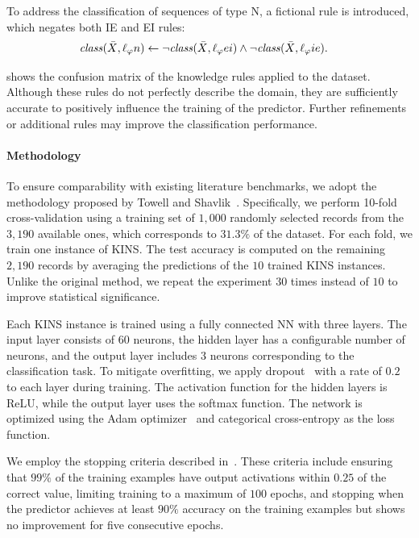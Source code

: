 To address the classification of sequences of type N, a fictional rule is introduced, which negates both \gls{IE} and \gls{EI} rules:
%
\begin{align}
    \mathit{class}(\bar{X}, \ell_{\varphi}{n}) &\leftarrow \neg \mathit{class}(\bar{X}, \ell_{\varphi}{ei}) \land \neg \mathit{class}(\bar{X}, \ell_{\varphi}{ie}).
\end{align}

 shows the confusion matrix of the knowledge rules applied to the dataset.
%
Although these rules do not perfectly describe the domain, they are sufficiently accurate to positively influence the training of the predictor.
%
Further refinements or additional rules may improve the classification performance.


\paragraph{Methodology}\label{par:kins-psjgs-methodology}
%
To ensure comparability with existing literature benchmarks, we adopt the methodology proposed by Towell and Shavlik~\cite{DBLP:journals/ai/TowellS94}.
%
Specifically, we perform 10-fold cross-validation using a training set of $1,000$ randomly selected records from the $3,190$ available ones, which corresponds to $31.3\%$ of the dataset.
%
For each fold, we train one instance of \gls{KINS}.
%
The test accuracy is computed on the remaining $2,190$ records by averaging the predictions of the $10$ trained \gls{KINS} instances.
%
Unlike the original method, we repeat the experiment $30$ times instead of $10$ to improve statistical significance.

Each \gls{KINS} instance is trained using a fully connected \gls{NN} with three layers.
%
The input layer consists of $60$ neurons, the hidden layer has a configurable number of neurons, and the output layer includes $3$ neurons corresponding to the classification task.
%
To mitigate overfitting, we apply dropout~\cite{DBLP:journals/jmlr/SrivastavaHKSS14} with a rate of $0.2$ to each layer during training.
%
The activation function for the hidden layers is \gls{ReLU}, while the output layer uses the softmax function.
%
The network is optimized using the Adam optimizer~\cite{DBLP:journals/corr/KingmaB14} and categorical cross-entropy as the loss function.

We employ the stopping criteria described in~\cite{DBLP:journals/ai/TowellS94}.
%
These criteria include ensuring that $99\%$ of the training examples have output activations within $0.25$ of the correct value, limiting training to a maximum of $100$ epochs, and stopping when the predictor achieves at least $90\%$ accuracy on the training examples but shows no improvement for five consecutive epochs.

